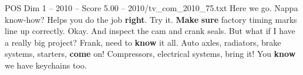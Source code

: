 \begin{textsample}{POS Dim 1 – 2010 – Score 5.00 – 2010/tv\_com\_2010\_75.txt}  \label{ex:f1_pos_062}
Here we go.
Nappa know-how?
Helps you do the job \textbf{right}.
Try it. \textbf{Make} \textbf{sure} factory timing marks line up correctly.
Okay.
And inspect the cam and crank seals.
But what if I have a really big project?
Frank, need to \textbf{know} it all.
Auto axles, radiators, brake systems, starters, \textbf{come} on!
Compressors, electrical systems, bring it!
You \textbf{know} we have keychains too.

\end{textsample}
